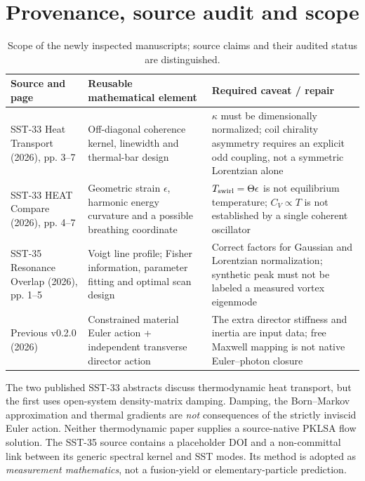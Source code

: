 \documentclass[11pt,a4paper]{article}
\begin{document}
\section{Provenance, source audit and scope}
\begin{table}[H]\centering\small
\caption{Scope of the newly inspected manuscripts; source claims and their audited status are distinguished.}
\begin{tabular}{p{.29\linewidth}p{.33\linewidth}p{.30\linewidth}}\toprule
Source and page & Reusable mathematical element & Required caveat / repair \\\midrule
SST-33 Heat Transport (2026), pp. 3--7 \cite{SST33heat} & Off-diagonal coherence kernel, linewidth and thermal-bar design & $\kappa$ must be dimensionally normalized; coil chirality asymmetry requires an explicit odd coupling, not a symmetric Lorentzian alone \\
SST-33 HEAT Compare (2026), pp. 4--7 \cite{SST33compare} & Geometric strain $\epsilon$, harmonic energy curvature and a possible breathing coordinate & $T_{\rm swirl}=\Theta\epsilon$ is not equilibrium temperature; $C_V\propto T$ is not established by a single coherent oscillator \\
SST-35 Resonance Overlap (2026), pp. 1--5 \cite{SST35} & Voigt line profile; Fisher information, parameter fitting and optimal scan design & Correct factors for Gaussian and Lorentzian normalization; synthetic peak must not be labeled a measured vortex eigenmode \\
Previous v0.2.0 (2026) \cite{SSTv020} & Constrained material Euler action + independent transverse director action & The extra director stiffness and inertia are input data; free Maxwell mapping is not native Euler--photon closure \\\bottomrule
\end{tabular}\end{table}
The two published SST-33 abstracts discuss thermodynamic heat transport, but the first uses open-system density-matrix damping. Damping, the Born--Markov approximation and thermal gradients are \emph{not} consequences of the strictly inviscid Euler action. Neither thermodynamic paper supplies a source-native PKLSA flow solution. The SST-35 source contains a placeholder DOI and a non-committal link between its generic spectral kernel and SST modes. Its method is adopted as \emph{measurement mathematics}, not a fusion-yield or elementary-particle prediction.
\end{document}
